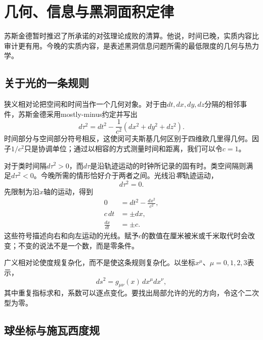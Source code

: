 \chapter{几何、信息与黑洞面积定律}


苏斯金德暂时推迟了所承诺的对弦理论成败的清算。他说，时间已晚，实质内容比审计更有用。今晚的实质内容，是表述黑洞信息问题所需的最低限度的几何与热力学。

\section{关于光的一条规则}

狭义相对论把空间和时间当作一个几何对象。对于由\(dt,dx,dy,dz\)分隔的相邻事件，苏斯金德采用mostly-minus约定并写出
\begin{equation}
d\tau^2=dt^2-\frac{1}{c^2}\left(dx^2+dy^2+dz^2\right).
\end{equation}
时间部分与空间部分符号相反，这使闵可夫斯基几何区别于四维欧几里得几何。因子\(1/c^2\)只是协调单位；通过以相容的方式测量时间和距离，我们可以令\(c=1\)。

对于类时间隔\(d\tau^2>0\)，而\(d\tau\)是沿轨迹运动的时钟所记录的固有时。类空间隔则满足\(d\tau^2<0\)。今晚所需的情形恰好介于两者之间。光线沿\emph{零}轨迹运动，
\begin{equation}
d\tau^2=0.
\end{equation}
先限制为沿\(x\)轴的运动，得到
\begin{align}
0&=dt^2-\frac{dx^2}{c^2},\\
c\,dt&=\pm dx,\\
\frac{dx}{dt}&=\pm c.
\end{align}
这些符号描述向右和向左运动的光线。赋予\(c\)的数值在厘米被米或千米取代时会改变；不变的说法不是一个数，而是零条件。

广义相对论使度规复杂化，而不是使这条规则复杂化。以坐标\(x^\mu\)、\(\mu=0,1,2,3\)表示，
\begin{equation}
ds^2=g_{\mu\nu}(x)\,dx^\mu dx^\nu,
\end{equation}
其中重复指标求和，系数可以逐点变化。要找出局部允许的光的方向，令这个二次型为零。

\section{球坐标与施瓦西度规}

